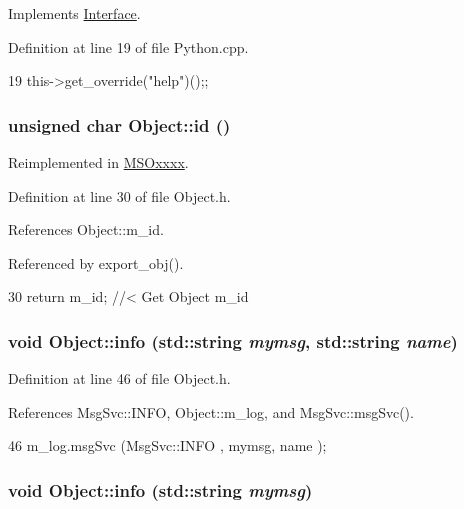 Implements \hyperlink{classInterface_aedd3cf1d964c837e7848ccf81dc9c760}{Interface}.

Definition at line 19 of file Python.cpp.


\begin{DoxyCode}
19 {this->get_override("help")();};
\end{DoxyCode}
\hypertarget{classObject_af99145335cc61ff6e2798ea17db009d2}{
\subsubsection[{id}]{\setlength{\rightskip}{0pt plus 5cm}unsigned char Object::id ()}}
\label{classObject_af99145335cc61ff6e2798ea17db009d2}


Reimplemented in \hyperlink{classMSOxxxx_a0f14b23d31d8e7647184e99a89600cc3}{MSOxxxx}.

Definition at line 30 of file Object.h.

References Object::m\_\-id.

Referenced by export\_\-obj().


\begin{DoxyCode}
30 { return m_id;         } //< Get Object m_id 
\end{DoxyCode}
\hypertarget{classObject_a1ca123253dfd30fc28b156f521dcbdae}{
\subsubsection[{info}]{\setlength{\rightskip}{0pt plus 5cm}void Object::info (std::string {\em mymsg}, \/  std::string {\em name})}}
\label{classObject_a1ca123253dfd30fc28b156f521dcbdae}


Definition at line 46 of file Object.h.

References MsgSvc::INFO, Object::m\_\-log, and MsgSvc::msgSvc().


\begin{DoxyCode}
46 { m_log.msgSvc (MsgSvc::INFO    , mymsg, name ); }
\end{DoxyCode}
\hypertarget{classObject_a644fd329ea4cb85f54fa6846484b84a8}{
\subsubsection[{info}]{\setlength{\rightskip}{0pt plus 5cm}void Object::info (std::string {\em mymsg})}}
\label{classObject_a644fd329ea4cb85f54fa6846484b84a8}


